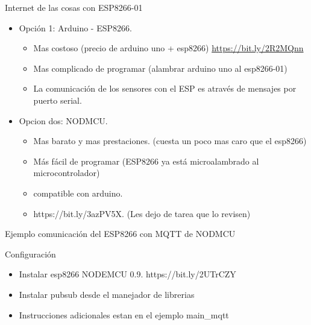 \documentclass{beamer}
\theoremstyle{definition}
\begin{document}
\begin{frame}{Internet de las cosas con ESP8266-01}

\begin{itemize}
\item Opción 1: Arduino - ESP8266. 
	\begin{itemize}
	\item Mas costoso (precio de arduino uno  + esp8266) \url{https://bit.ly/2R2MQnn}
	\item Mas complicado de programar (alambrar arduino uno al esp8266-01) 
	\item La comunicación de los sensores con el ESP es através de mensajes por puerto serial.
	\end{itemize}
\item Opcion dos: NODMCU. 
	\begin{itemize}
		\item Mas barato y mas prestaciones. (cuesta un poco mas caro que el esp8266)
		\item Más fácil de programar (ESP8266 ya está microalambrado al microcontrolador) 
		\item compatible con arduino.
		\item https://bit.ly/3azPV5X. (Les dejo de tarea que lo revisen)
	\end{itemize}
  
\end{itemize}

\end{frame}

\begin{frame}{Ejemplo comunicación del ESP8266 con MQTT de NODMCU }

Configuración
\begin{itemize}
\item Instalar esp8266 NODEMCU 0.9. https://bit.ly/2UTrCZY
\item Instalar pubsub desde el manejador de librerias
\item Instrucciones adicionales estan en el ejemplo main_mqtt
\end{itemize}

\end{frame}
\end{document}
